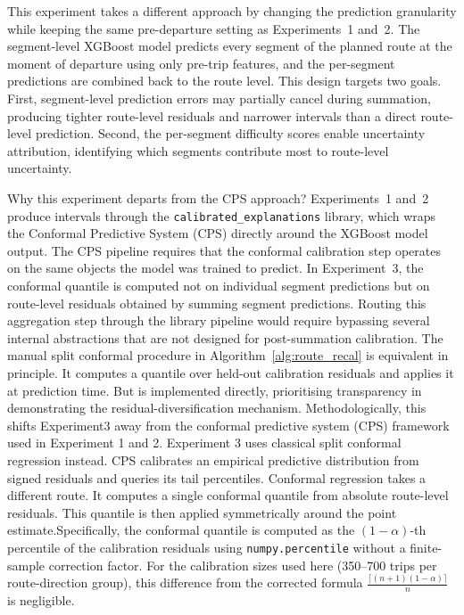 \documentclass[12pt, a4paper, oneside]{report}
\begin{document}
This experiment takes a different approach by changing the prediction granularity while keeping the same pre-departure setting as Experiments~1 and~2. The segment-level XGBoost model predicts every segment of the planned route at the moment of departure using only pre-trip features, and the per-segment predictions are combined back to the route level. This design targets two goals. First, segment-level prediction errors may partially cancel during summation, producing tighter route-level residuals and narrower intervals than a direct route-level prediction. Second, the per-segment difficulty scores enable uncertainty attribution, identifying which segments contribute most to route-level uncertainty.

Why this experiment departs from the CPS approach? Experiments~1 and~2 produce intervals through the \texttt{calibrated\_explanations} library, which wraps the Conformal Predictive System (CPS) directly around the XGBoost model output. The CPS pipeline requires that the conformal calibration step operates on the same objects the model was trained to predict. In Experiment~3, the conformal quantile is computed not on individual segment predictions but on route-level residuals obtained by summing segment predictions. Routing this aggregation step through the library pipeline would require bypassing several internal abstractions that are not designed for post-summation calibration. The manual split conformal procedure in Algorithm~\ref{alg:route_recal} is equivalent in principle. It computes a quantile over held-out calibration residuals and applies it at prediction time. But is implemented directly, prioritising transparency in demonstrating the residual-diversification mechanism. Methodologically, this shifts Experiment3 away from the conformal predictive system (CPS) framework used in Experiment 1 and 2. Experiment 3 uses classical split conformal regression instead. CPS calibrates an empirical predictive distribution from signed residuals and queries its tail percentiles. Conformal regression takes a different route. It computes a single conformal quantile from absolute route-level residuals. This quantile is then applied symmetrically around the point estimate.Specifically, the conformal quantile is computed as the $(1-\alpha)$-th percentile of the calibration residuals using \texttt{numpy.percentile} without a finite-sample correction factor. For the calibration sizes used here (350--700 trips per route-direction group), this difference from the corrected formula $\frac{\lceil(n+1)(1-\alpha)\rceil}{n}$ is negligible.
\end{document}
